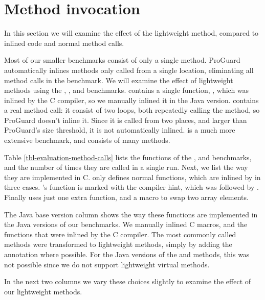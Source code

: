 \section{Method invocation}
\label{sec-evaluation-method-invocation}


In this section we will examine the effect of the lightweight method, compared to inlined code and normal method calls.

Most of our smaller benchmarks consist of only a single method. ProGuard automatically inlines methods only called from a single location, eliminating all method calls in the  benchmark. We will examine the effect of lightweight methods using the , , and  benchmarks.
 contains a single function, , which was inlined by the C compiler, so we manually inlined it in the Java version.  contains a real method call: it consist of two loops, both repeatedly calling the  method, so ProGuard doesn't inline it. Since it is called from two places, and larger than ProGuard's size threshold, it is not automatically inlined.  is a much more extensive benchmark, and consists of many methods.

Table \ref{tbl-evaluation-method-calls} lists the functions of the ,  and  benchmarks, and the number of times they are called in a single run. Next, we list the way they are implemented in C.  only defines normal functions, which are inlined by  in three cases. 's  function is marked with the  compiler hint, which was followed by . Finally  uses just one extra function, and a macro to swap two array elements.

The Java base version column shows the way these functions are implemented in the Java versions of our benchmarks. We manually inlined C macros, and the functions that were inlined by the C compiler. The most commonly called methods were transformed to lightweight methods, simply by adding the  annotation where possible. For the Java versions of the  and  methods, this was not possible since we do not support lightweight virtual methods.

In the next two columns we vary these choices slightly to examine the effect of our lightweight methods.

